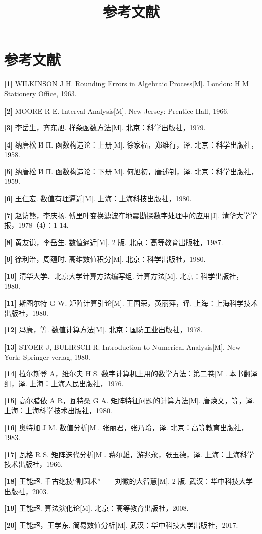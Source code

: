 \documentclass[
  10pt,
  fontset=fandol]{ctexart}
\title{参考文献}
\author{}
\date{}
\begin{document}
\maketitle

\section{参考文献}\label{ux53c2ux8003ux6587ux732e}

\textbf{{[}1{]}} WILKINSON J H. Rounding Errors in Algebraic Process{[}M{]}. London: H M Stationery Office, 1963.

\textbf{{[}2{]}} MOORE R E. Interval Analysis{[}M{]}. New Jersey: Prentice-Hall, 1966.

\textbf{{[}3{]}} 李岳生，齐东旭. 样条函数方法{[}M{]}. 北京：科学出版社，1979.

\textbf{{[}4{]}} 纳唐松 И П. 函数构造论：上册{[}M{]}. 徐家福，郑维行，译. 北京：科学出版社，1958.

\textbf{{[}5{]}} 纳唐松 И П. 函数构造论：下册{[}M{]}. 何旭初，唐述钊，译. 北京：科学出版社，1959.

\textbf{{[}6{]}} 王仁宏. 数值有理逼近{[}M{]}. 上海：上海科技出版社，1980.

\textbf{{[}7{]}} 赵访熊，李庆扬. 傅里叶变换滤波在地震勘探数字处理中的应用{[}J{]}. 清华大学学报，1978（4）：1-14.

\textbf{{[}8{]}} 黄友谦，李岳生. 数值逼近{[}M{]}. 2 版. 北京：高等教育出版社，1987.

\textbf{{[}9{]}} 徐利治，周蕴时. 高维数值积分{[}M{]}. 北京：科学出版社，1980.

\textbf{{[}10{]}} 清华大学、北京大学计算方法编写组. 计算方法{[}M{]}. 北京：科学出版社，1980.

\textbf{{[}11{]}} 斯图尔特 G W. 矩阵计算引论{[}M{]}. 王国荣，黄丽萍，译. 上海：上海科学技术出版社，1980.

\textbf{{[}12{]}} 冯康，等. 数值计算方法{[}M{]}. 北京：国防工业出版社，1978.

\textbf{{[}13{]}} STOER J, BULIRSCH R. Introduction to Numerical Analysis{[}M{]}. New York: Springer-verlag, 1980.

\textbf{{[}14{]}} 拉尔斯登 A，维尔夫 H S. 数字计算机上用的数学方法：第二卷{[}M{]}. 本书翻译组，译. 上海：上海人民出版社，1976.

\textbf{{[}15{]}} 高尔腊依 A R，瓦特桑 G A. 矩阵特征问题的计算方法{[}M{]}. 唐焕文，等，译. 上海：上海科学技术出版社，1980.

\textbf{{[}16{]}} 奥特加 J M. 数值分析{[}M{]}. 张丽君，张乃玲，译. 北京：高等教育出版社，1983.

\textbf{{[}17{]}} 瓦格 R S. 矩阵迭代分析{[}M{]}. 蒋尔雄，游兆永，张玉德，译. 上海：上海科学技术出版社，1966.

\textbf{{[}18{]}} 王能超. 千古绝技``割圆术''------刘徽的大智慧{[}M{]}. 2 版. 武汉：华中科技大学出版社，2003.

\textbf{{[}19{]}} 王能超. 算法演化论{[}M{]}. 北京：高等教育出版社，2008.

\textbf{{[}20{]}} 王能超，王学东. 简易数值分析{[}M{]}. 武汉：华中科技大学出版社，2017.
\end{document}
